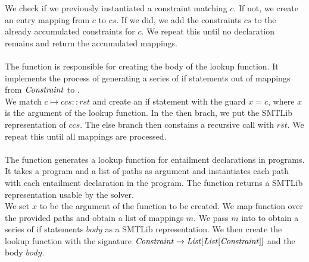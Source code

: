We check if we previously instantiated a constraint matching $c$.
If not, we create an entry mapping from $c$ to $cs$.
If we did, we add the constraints $cs$ to the already
accumulated constraints for $c$.
We repeat this until no declaration remains
and return the accumulated mappings.\\
\\
The function 
is responsible for creating the body of the lookup function.
It implements the process of generating a series
of if statements out of mappings from $\mathit{Constraint}$ to \Constrss.\\
%
We match $c \mapsto ccs :: rst$
and create an if statement with the guard $x = c$,
where $x$ is the argument of the lookup function.
In the then brach, we put the SMTLib representation of $ccs$.
The else branch then constains a recursive call with $rst$.
We repeat this until all mappings are processed.\\
\\
The function 
generates a lookup function for entailment declarations in programs.
It takes a program and a list of paths as argument
and instantiates each path with each
entailment declaration in the program.
The function returns a SMTLib representation usable by the solver.\\
%
We set $x$ to be the argument of the function to be created.
We map function 
over the provided paths and obtain a list of mappings $m$.
We pass $m$ into 
to obtain a series of if statements $body$ as a SMTLib representation.
We then create the lookup function with the signature
$\mathit{Constraint} \rightarrow \mathit{List[\mathit{List[\mathit{Constraint}]}]}$ and the body $body$.

\newpage
